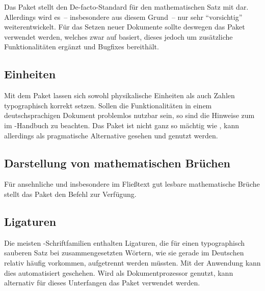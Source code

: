 \documentclass[%
  english,ngerman,%
  geometry=no,DIV=12,automark,%
]{tudscrartcl}
\begin{document}
Das Paket  stellt den De-facto-Standard für den mathematischen 
Satz mit  dar. Allerdings wird es~-- insbesondere aus diesem 
Grund~-- nur sehr \enquote{vorsichtig} weiterentwickelt. Für das Setzen neuer 
Dokumente sollte deswegen das Paket  verwendet werden, 
welches zwar auf  basiert, dieses jedoch um zusätzliche 
Funktionalitäten ergänzt und Bugfixes bereithält.


\subsection{Einheiten}
Mit dem Paket  lassen sich sowohl physikalische Einheiten als 
auch Zahlen typographisch korrekt setzen. Sollen die Funktionalitäten in einem 
deutschsprachigen Dokument problemlos nutzbar sein, so sind die Hinweise zum 
im \TUDScript-Handbuch zu beachten. Das Paket  ist nicht ganz so 
mächtig wie , kann allerdings als pragmatische Alternative 
gesehen und genutzt werden.


\subsection{Darstellung von mathematischen Brüchen}
Für ansehnliche und insbesondere im Fließtext gut lesbare mathematische Brüche 
stellt das Paket  den Befehl  zur Verfügung.
%
\begin{Preamble}
\usepackage{xfrac}

\end{Preamble}


\subsection{Ligaturen}
Die meisten -Schriftfamilien enthalten Ligaturen, die für einen 
typographisch sauberen Satz bei zusammengesetzten Wörtern, wie sie gerade im 
Deutschen relativ häufig vorkommen, aufgetrennt werden müssten. Mit der 
Anwendung \href{http://www.ctan.org/pkg/delig}{} kann dies 
automatisiert geschehen. Wird  als Dokumentprozessor genutzt, 
kann alternativ für dieses Unterfangen das Paket  verwendet 
werden.
\end{document}
